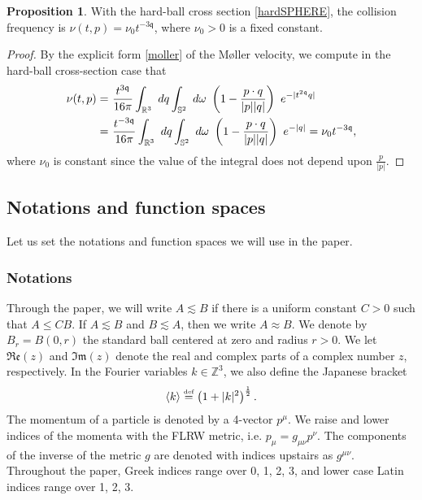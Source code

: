 \documentclass[reqno]{amsart}
\newcommand{\eqdef }{\overset{\mbox{\tiny{def}}}{=}}
\newcommand{\pv}{p}
\newcommand{\pZ}{|\pv|}
\newcommand{\qv}{q}
\newcommand{\qZ}{|\qv|}
\newcommand{\qq}{\mathfrak{q}}
\newcommand{\tqq}{t^{2\qq}}
\newcommand{\Z}{\mathbb{Z}}
\newcommand{\real}[1]{\mathfrak{Re}\left(#1\right)}
\newcommand{\imag}[1]{\mathfrak{Im}\left(#1\right)}
\theoremstyle{definition}
\newtheorem{proposition}[theorem]{Proposition}
\numberwithin{equation}{section}
\numberwithin{theorem}{section}
\begin{document}
\begin{proposition}\label{LEM:nuASYMP}
    With the hard-ball cross section \eqref{hardSPHERE}, the collision frequency is \(\nu(t,p)=\nu_0 t^{-3\qq}\), where \(\nu_0>0\) is a fixed constant.  
\end{proposition}

\begin{proof}
By the explicit form \eqref{moller} of the Møller velocity, we compute in the hard-ball cross-section case that
\begin{align}\label{nuDEFnext}
    \nu(t,p) =&~
\frac{t^{3\qq}}{16\pi}\int_{\mathbb{R}^3} ~  dq 
\int_{\mathbb{S}^{2}} ~ d\omega
~  \left(1 - \frac{p\cdot q}{\pZ\qZ}\right) ~
    e^{-{| \tqq q|}}
    \\ \notag
    =&~
\frac{t^{-3\qq}}{16\pi}\int_{\mathbb{R}^3} ~  dq 
\int_{\mathbb{S}^{2}} ~ d\omega
~  \left(1 - \frac{p\cdot q}{\pZ\qZ}\right) ~
    e^{-{|  q|}} = \nu_0t^{-3\qq},
\end{align}
where $\nu_0$ is constant since the value of the integral does not depend upon $\frac{p}{\pZ}$.
\end{proof}





\subsection{Notations and function spaces}\label{sec.notation}

Let us set the notations and function spaces we will use in the paper. 


\subsubsection{Notations}


Through the paper, we will write \(A \lesssim B\) if there is a uniform constant \(C > 0\) such
that \(A \leq C B\). If \(A \lesssim B\) and \(B \lesssim A\), then we write \(A \approx  B\). We denote by \(B_r = B(0,r)\) the standard ball centered at zero and radius \(r > 0\). We let $\real{z}$ and $\imag{z}$ denote the real and complex parts of a complex number $z$, respectively. In the Fourier variables $k\in \Z^3$, we also define the Japanese bracket
\begin{align}\notag 
   \langle k \rangle \eqdef \left(1+|k|^2 \right)^{\frac12}. 
\end{align}
The momentum of a particle is denoted by a 4-vector \(p^\mu\). We raise and lower indices of the momenta with the FLRW metric, i.e. \(p_{\mu} = g_{\mu\nu} p^{\nu}\). The components of the inverse of the metric \(g\) are denoted with indices upstairs as \(g^{\mu\nu}\). Throughout the paper, Greek indices range over 0, 1, 2, 3, and lower case Latin indices range over 1, 2, 3.
\end{document}
